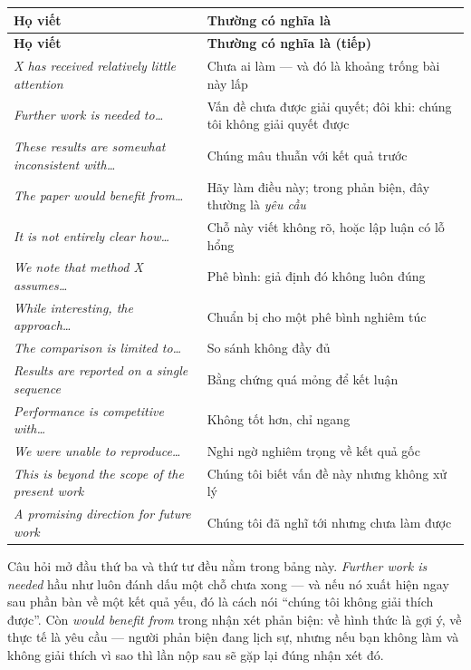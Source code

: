 \documentclass[../../english.tex]{subfiles}
\begin{document}
\begin{center}\footnotesize
{}
\begin{longtable}{@{}L{6.4cm}L{7.8cm}@{}}
\toprule
\textbf{Họ viết} & \textbf{Thường có nghĩa là}\\
\midrule
\endfirsthead
\toprule
\textbf{Họ viết} & \textbf{Thường có nghĩa là (tiếp)}\\
\midrule
\endhead
\emph{X has received relatively little attention} & Chưa ai làm --- và đó là khoảng trống bài này lấp\\
\emph{Further work is needed to\ldots} & Vấn đề chưa được giải quyết; đôi khi: chúng tôi không giải quyết được\\
\emph{These results are somewhat inconsistent with\ldots} & Chúng mâu thuẫn với kết quả trước\\
\emph{The paper would benefit from\ldots} & Hãy làm điều này; trong phản biện, đây thường là \emph{yêu cầu}\\
\emph{It is not entirely clear how\ldots} & Chỗ này viết không rõ, hoặc lập luận có lỗ hổng\\
\emph{We note that method X assumes\ldots} & Phê bình: giả định đó không luôn đúng\\
\emph{While interesting, the approach\ldots} & Chuẩn bị cho một phê bình nghiêm túc\\
\emph{The comparison is limited to\ldots} & So sánh không đầy đủ\\
\emph{Results are reported on a single sequence} & Bằng chứng quá mỏng để kết luận\\
\emph{Performance is competitive with\ldots} & Không tốt hơn, chỉ ngang\\
\emph{We were unable to reproduce\ldots} & Nghi ngờ nghiêm trọng về kết quả gốc\\
\emph{This is beyond the scope of the present work} & Chúng tôi biết vấn đề này nhưng không xử lý\\
\emph{A promising direction for future work} & Chúng tôi đã nghĩ tới nhưng chưa làm được\\
\bottomrule
\end{longtable}
\end{center}

Câu hỏi mở đầu thứ ba và thứ tư đều nằm trong bảng này. \emph{Further work is needed} hầu như luôn đánh dấu một chỗ chưa xong --- và nếu nó xuất hiện ngay sau phần bàn về một kết quả yếu, đó là cách nói ``chúng tôi không giải thích được''. Còn \emph{would benefit from} trong nhận xét phản biện: về hình thức là gợi ý, về thực tế là yêu cầu --- người phản biện đang lịch sự, nhưng nếu bạn không làm và không giải thích vì sao thì lần nộp sau sẽ gặp lại đúng nhận xét đó.
\end{document}
